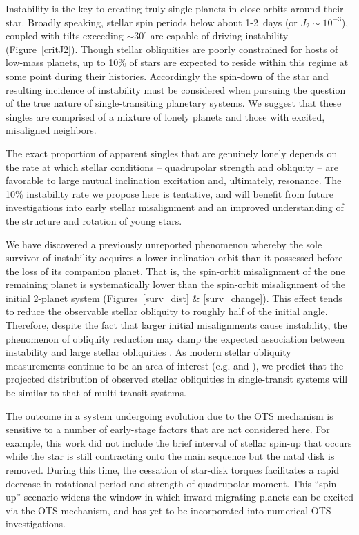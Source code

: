 \documentclass[twocolumn]{aastex63}
\begin{document}
Instability is the key to creating truly single planets in close orbits around their star. Broadly speaking, stellar spin periods below about 1-2\, days (or  $J_2\sim10^{-3}$), coupled with tilts exceeding $\sim30^\circ$ are capable of driving instability (Figure~\ref{critJ2}). Though stellar obliquities are poorly constrained for hosts of low-mass planets, up to 10\% of stars are expected to reside within this regime at some point during their histories. Accordingly the spin-down of the star and resulting incidence of instability must be considered when pursuing the question of the true nature of single-transiting planetary systems. We suggest that these singles are comprised of a mixture of lonely planets and those with excited, misaligned neighbors.

The exact proportion of apparent singles that are genuinely lonely depends on the rate at which stellar conditions – quadrupolar strength and obliquity – are favorable to large mutual inclination excitation and, ultimately, resonance. The 10\% instability rate we propose here is tentative, and will benefit from future investigations into early stellar misalignment and an improved understanding of the structure and rotation of young stars.

We have discovered a previously unreported phenomenon whereby the sole survivor of instability acquires a lower-inclination orbit than it possessed before the loss of its companion planet. That is, the spin-orbit misalignment of the one remaining planet is systematically lower than the spin-orbit misalignment of the initial 2-planet system (Figures~\ref{surv_dist} \& \ref{surv_change}). This effect tends to reduce the observable stellar obliquity to roughly half of the initial angle. Therefore, despite the fact that larger initial misalignments cause instability, the phenomenon of obliquity reduction may damp the expected association between instability and large stellar obliquities \citep{morton2014obliquities}. As modern stellar obliquity measurements continue to be an area of interest (e.g. \cite{winn2017constraints} and \cite{dai2020TKS}), we predict that the projected distribution of observed stellar obliquities in single-transit systems will be similar to that of multi-transit systems.

The outcome in a system undergoing evolution due to the OTS mechanism is sensitive to a number of early-stage factors that are not considered here. For example, this work did not include the brief interval of stellar spin-up that occurs while the star is still contracting onto the main sequence but the natal disk is removed. During this time, the cessation of star-disk torques facilitates a rapid decrease in rotational period and strength of quadrupolar moment. This “spin up” scenario widens the window in which inward-migrating planets can be excited via the OTS mechanism, and has yet to be incorporated into numerical OTS investigations.  
\end{document}
